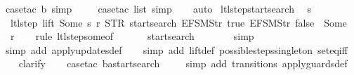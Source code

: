 \begin{isabellebody}
\ {\isacharparenleft}case{\isacharunderscore}tac\ b{\isacharcomma}\ simp{\isacharparenright}\isanewline
\ \ \ \isamarkupfalse%
\ {\isacharparenleft}case{\isacharunderscore}tac\ list{\isacharcomma}\ simp{\isacharparenright}\isanewline
\ \ \isamarkupfalse%
\ auto%
\endisatagproof
{\isafoldproof}%
%
\isadelimproof
\isanewline
%
\endisadelimproof
\isanewline
{}\isamarkupfalse%
\ ltl{\isacharunderscore}step{\isacharunderscore}startsearch{\isacharcolon}\isanewline
\ \ {\isachardoublequoteopen}s\ {\isasymin}\ {\isacharbraceleft}{}{\isacharcomma}\ {}{\isacharcomma}\ {}{\isacharcomma}\ {}{\isacharbraceright}\ {\isasymLongrightarrow}\isanewline
\ \ ltl{\isacharunderscore}step\ lift\ {\isacharparenleft}Some\ s{\isacharparenright}\ r\ {\isacharparenleft}STR\ {\isacharprime}{\isacharprime}startsearch{\isacharprime}{\isacharprime}{\isacharcomma}\ {\isacharbrackleft}EFSM{\isachardot}Str\ {\isacharprime}{\isacharprime}true{\isacharprime}{\isacharprime}{\isacharcomma}\ EFSM{\isachardot}Str\ {\isacharprime}{\isacharprime}false{\isacharprime}{\isacharprime}{\isacharbrackright}{\isacharparenright}\ {\isacharequal}\ {\isacharparenleft}Some\ {}{\isacharcomma}\ {\isacharbrackleft}{\isacharbrackright}{\isacharcomma}\ r{\isacharparenright}{\isachardoublequoteclose}\isanewline
%
\isadelimproof
\ \ %
\endisadelimproof
%
\isatagproof
{}\isamarkupfalse%
\ {\isacharparenleft}rule\ ltl{\isacharunderscore}step{\isacharunderscore}some{\isacharbrackleft}of\ {\isacharunderscore}\ {\isacharunderscore}\ {\isacharunderscore}\ {\isacharunderscore}\ {\isacharunderscore}\ {}\ startsearch{\isacharbrackright}{\isacharparenright}\isanewline
\ \ \ \ \isamarkupfalse%
\ \isamarkupfalse%
\ simp\isanewline
\ \ \ \isamarkupfalse%
\ {\isacharparenleft}simp\ add{\isacharcolon}\ apply{\isacharunderscore}updates{\isacharunderscore}def{\isacharparenright}\isanewline
\ \ \isamarkupfalse%
\ {\isacharparenleft}simp\ add{\isacharcolon}\ lift{\isacharunderscore}def\ possible{\isacharunderscore}steps{\isacharunderscore}singleton\ set{\isacharunderscore}eq{\isacharunderscore}iff{\isacharparenright}\isanewline
\ \ \isamarkupfalse%
\ clarify\isanewline
\ \ \isamarkupfalse%
\ {\isacharparenleft}case{\isacharunderscore}tac\ {\isachardoublequoteopen}ba{\isacharequal}startsearch{\isachardoublequoteclose}{\isacharparenright}\isanewline
\ \ \ \isamarkupfalse%
\ {\isacharparenleft}simp\ add{\isacharcolon}\ transitions\ apply{\isacharunderscore}guards{\isacharunderscore}def{\isacharparenright}\isanewline

\end{isabellebody}
